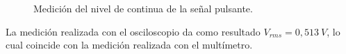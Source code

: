 \begin{figure}[H]
        \caption{Medición del nivel de continua de la señal pulsante.}
        \label{fig:Exp2SeñalPulsanteContinua}
      \end{figure}        

      La medición realizada con el osciloscopio da como resultado $V_{rms}=0,513~V$, lo cual coincide con la medición realizada
      con el multímetro.

